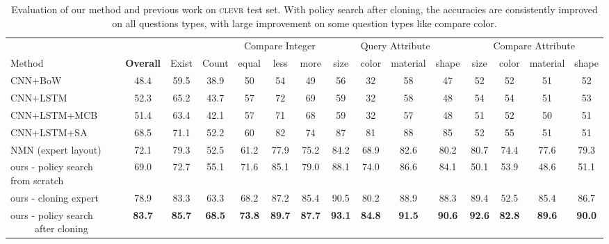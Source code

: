 \documentclass[10pt,twocolumn,letterpaper]{article}
\newcommand{\clevr}{\textsc{clevr}\xspace}
\begin{document}
\begin{table*}[t]
\footnotesize
\center
\begin{tabular}{lcccccccccccccc}
\toprule
  & & & & \multicolumn{3}{c}{Compare Integer} & \multicolumn{4}{c}{Query Attribute} & \multicolumn{4}{c}{Compare Attribute} \\
  \cmidrule(l){5-7}\cmidrule(l){8-11}\cmidrule(l){12-15}
  Method & \textbf{Overall} & Exist & Count & equal & less & more & size & color & material & shape & size & color & material & shape \\
  \cmidrule(r){1-1} \cmidrule(r){2-2} \cmidrule(r){3-3} \cmidrule(r){4-4} \cmidrule(l){5-7}\cmidrule(l){8-11}\cmidrule(l){12-15}
  CNN+BoW \cite{zhou2016simple} & 48.4 & 59.5 & 38.9 & 50 & 54 & 49 & 56 & 32 & 58 & 47 & 52 & 52 & 51 & 52 \\
  CNN+LSTM \cite{antol15iccv} & 52.3 & 65.2 & 43.7 & 57 & 72 & 69 & 59 & 32 & 58 & 48 & 54 & 54 & 51 & 53 \\
  CNN+LSTM+MCB \cite{fukui16emnlp} & 51.4 & 63.4 & 42.1 & 57 & 71 & 68 & 59 & 32 & 57 & 48 & 51 & 52 & 50 & 51 \\
  CNN+LSTM+SA  \cite{yang2016stacked} & 68.5 & 71.1 & 52.2 & 60 & 82 & 74 & 87 & 81 & 88 & 85 & 52 & 55 & 51 & 51 \\
  \cmidrule(r){1-15}
  NMN (expert layout) \cite{andreas16neural}  & 72.1 & 79.3 & 52.5 & 61.2 & 77.9 & 75.2 & 84.2 & 68.9 & 82.6 & 80.2 & 80.7 & 74.4 & 77.6 & 79.3 \\
  \cmidrule(r){1-15}
  \multicolumn{1}{m{2.5cm}}{ours - policy search from scratch} & 69.0 & 72.7 & 55.1 & 71.6 & 85.1 & 79.0 & 88.1 & 74.0 & 86.6 & 84.1 & 50.1 & 53.9 & 48.6 & 51.1 \\
  ours - cloning expert  & 78.9 & 83.3 & 63.3 & 68.2 & 87.2 & 85.4 & 90.5 & 80.2 & 88.9 & 88.3 & 89.4 & 52.5 & 85.4 & 86.7 \\
  \multicolumn{1}{m{2.5cm}}{ours - policy search ~~~~~after cloning} & \textbf{83.7} & \textbf{85.7} & \textbf{68.5} & \textbf{73.8} & \textbf{89.7} & \textbf{87.7} & \textbf{93.1} & \textbf{84.8} & \textbf{91.5} & \textbf{90.6} & \textbf{92.6} & \textbf{82.8} & \textbf{89.6} & \textbf{90.0} \\
\bottomrule
\end{tabular}\vspace{-0.2cm}
\caption{Evaluation of our method and previous work on \clevr test set. With policy search after cloning, the accuracies are consistently improved on all questions types, with large improvement on some question types like compare color.}
\label{tab:results_clevr}
\vspace{-0.5cm}
\end{table*}
\end{document}
